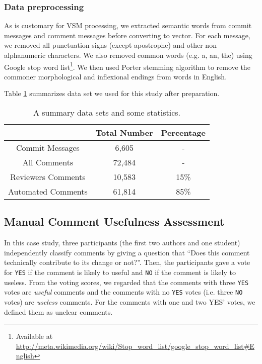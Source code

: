 %

\subsubsection{Data preprocessing}
As is customary for VSM processing, we extracted semantic words from commit messages and comment messages before converting to vector.
For each message, we removed all punctuation signs (except apostrophe) and other non alphanumeric characters. We also removed common words (e.g. a, an, the) using Google stop word list\footnote{Available at \url{http://meta.wikimedia.org/wiki/Stop_word_list/google_stop_word_list#English}}. We then used Porter stemming algorithm to remove the commoner morphological and inflexional endings from words in English.

Table \ref{tb:datastatistic} summarizes data set we used for this study after preparation. 

\begin{table}[!h]
\caption{A summary data sets and some statistics.}
\centering
\small
\begin{tabular}{ccc}
\hline
& Total Number & Percentage \\ \hline \hline
Commit Messages & 6,605 &  -  \\ \hline
All Comments & 72,484& - \\ \hline
Reviewers Comments & 10,583 & 15\% \\ \hline
Automated Comments & 61,814 & 85\% \\ \hline 

\end{tabular}
\label{tb:datastatistic}
\end{table}
\subsection{Manual Comment Usefulness Assessment}
In this case study, three participants (the first two authors and one student) independently classify comments by giving a question that “Does this comment technically contribute to its change or not?”. Then, the participants gave a vote for \texttt{YES} if the comment is likely to useful and  \texttt{NO}  if the comment is likely to useless. From the voting scores, we regarded that the comments with three  \texttt{YES}  votes are \emph{useful} comments and the comments with no  \texttt{YES}  votes (i.e. three  \texttt{NO}  votes) are \emph{useless} comments. For the comments with one and two YES’ votes, we defined them as unclear comments.

